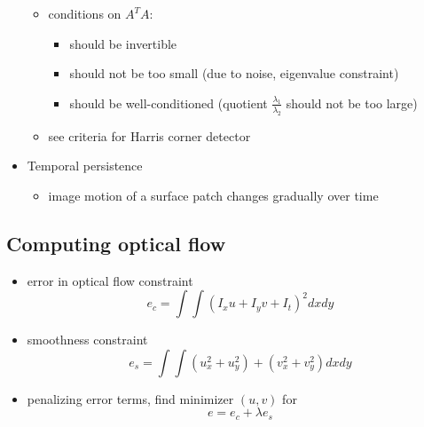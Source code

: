 \documentclass[12pt]{article}
\begin{document}
\begin{itemize}
\begin{itemize}
				\item conditions on $A^TA$:
					\begin{itemize}
						\item should be invertible
						\item should not be too small (due to noise, eigenvalue constraint)
						\item should be well-conditioned (quotient $\frac{\lambda_1}{\lambda_2}$ should not be too large)
					\end{itemize}
				\item see criteria for Harris corner detector
			\end{itemize}
		\item Temporal persistence
			\begin{itemize}
				\item image motion of a surface patch changes gradually over time
			\end{itemize}
	\end{itemize}

	\subsection{Computing optical flow}
	\begin{itemize}
		\item error in optical flow constraint
			\begin{equation}
				e_c = \int \int (I_xu + I_yv + I_t)^2 dx dy
			\end{equation}
		\item smoothness constraint
			\begin{equation}
				e_s = \int \int (u_x^2 + u_y^2) + (v_x^2 + v_y^2) dx dy
			\end{equation}
		\item penalizing error terms, find minimizer $(u,v)$ for
			\begin{equation}
				e = e_c + \lambda e_s
			\end{equation}
	\end{itemize}
	
\end{document}
